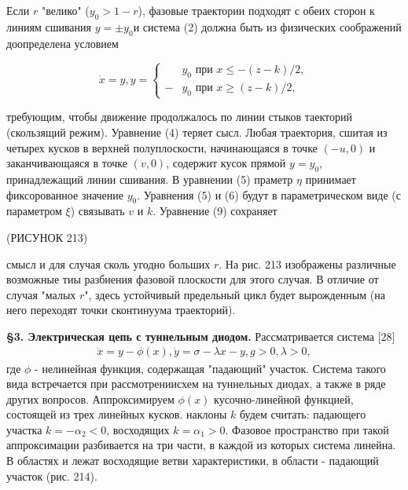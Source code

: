 \documentclass{article}
\newcommand{\RomanNumeralCaps}[1]
    {\MakeUppercase{\romannumeral #1}}
\begin{document}
Если $r$ "велико" ($y_{0}>1-r$), фазовые траектории подходят с 
обеих сторон к линиям сшивания $y=\pm y_{0}$и система (2) должна
быть из физических соображений доопределена условием
\begin{center}
$$
\dot{x}=y, y=
\left\{
    \begin{array}{ll}
        &y_{0}  \mbox{ при } x \leq -(z-k)/2,\\
        -&y_{0}  \mbox{ при } x \geq (z-k)/2,
    \end{array}
\right.
$$
\end{center}
требующим, чтобы движение продолжалось по линии стыков таекторий
(скользящий режим). Уравнение (4) теряет сысл. Любая 
траектория, сшитая из четырех кусков в верхней полуплоскости,
начинающаяся в точке $(-u, 0)$ и заканчивающаяся в точке
$(v, 0)$, содержит кусок прямой $y=y_{0}$, принадлежащий линии
сшивания. В уравнении (5) праметр $\eta$ принимает фиксорованное
значение $y_{0}$. Уравнения (5) и (6) будут в параметрическом
виде (с параметром $\xi$) связывать $v$ и $k$. Уравнение (9) сохраняет

(РИСУНОК 213)

смысл и для случая сколь угодно больших $r$. На рис. 213 изображены
различные возможные тиы разбиения фазовой плоскости
для этого случая. В отличие от случая "малых $r$", здесь устойчивый
предельный цикл будет вырожденным (на него переходят
точки сконтинуума траекторий).

\textbf{\S 3. Электрическая цепь с туннельным диодом.} Рассматривается
 система [28]
\begin{gather}
\dot{x}=y-\phi(x), \dot{y}=\sigma - \lambda x-y, g>0, \lambda>0,
\end{gather}
где $\phi$ - нелинейная  функция, содержащая "падающий" участок.
Система такого вида встречается при рассмотрениисхем на 
туннельных диодах, а также в ряде других вопросов. Аппроксимируем
$\phi(x)$ кусочно-линейной функцией, состоящей из трех линейных
кусков. наклоны $k$ будем считать: падающего участка
$k=-\alpha_{2}<0$, восходящих $k=\alpha_{1}>0$. Фазовое пространство при
такой аппроксимации разбивается на три части, в каждой из которых
система линейна. В областях \RomanNumeralCaps{1} и \RomanNumeralCaps{3} лежат восходящие
ветви характеристики, в области \RomanNumeralCaps{2} - падающий участок (рис. 214).
\end{document}
